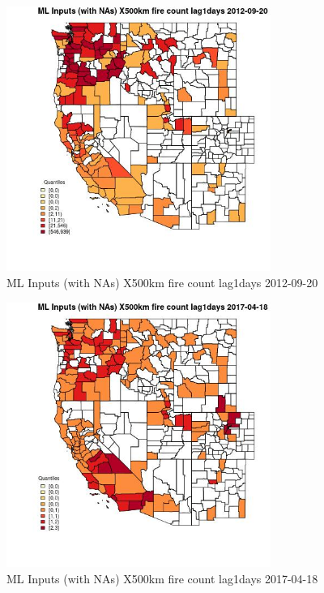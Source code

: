 \begin{figure} 
\centering  
\includegraphics[width=0.77\textwidth]{Code_Outputs/Report_ML_input_PM25_Step4_part_e_de_duplicated_aves_compiled_2019-05-14wNAs_CountyX500km_fire_count_lag1daysMean2012-09-20_2012-09-20.jpg} 
\caption{\label{fig:Report_ML_input_PM25_Step4_part_e_de_duplicated_aves_compiled_2019-05-14wNAsCountyX500km_fire_count_lag1daysMean2012-09-20_2012-09-20}ML Inputs (with NAs) X500km fire count lag1days 2012-09-20} 
\end{figure} 
 

\begin{figure} 
\centering  
\includegraphics[width=0.77\textwidth]{Code_Outputs/Report_ML_input_PM25_Step4_part_e_de_duplicated_aves_compiled_2019-05-14wNAs_CountyX500km_fire_count_lag1daysMean2017-04-18_2017-04-18.jpg} 
\caption{\label{fig:Report_ML_input_PM25_Step4_part_e_de_duplicated_aves_compiled_2019-05-14wNAsCountyX500km_fire_count_lag1daysMean2017-04-18_2017-04-18}ML Inputs (with NAs) X500km fire count lag1days 2017-04-18} 
\end{figure} 
 

